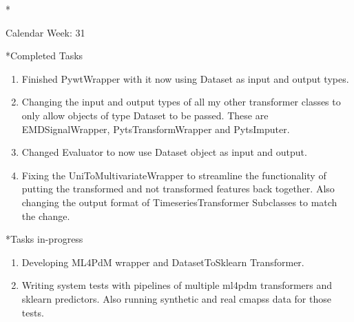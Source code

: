 \documentclass[11pt,a4paper]{article}
\begin{document}
\newpage
\begin{section}*{Calendar Week: 31 \hfill \date{06 August, 2021}}
	
	\begin{subsection}*{Completed Tasks}
		\begin{enumerate}
			\item Finished PywtWrapper with it now using Dataset as input and output types.
			\item Changing the input and output types of all my other transformer classes to only allow objects of type Dataset to be passed. These are EMDSignalWrapper, PytsTransformWrapper and PytsImputer.
			\item Changed Evaluator to now use Dataset object as input and output.
			\item Fixing the UniToMultivariateWrapper to streamline the functionality of putting the transformed and not transformed features back together. Also changing the output format of TimeseriesTransformer Subclasses to match the change.
		\end{enumerate}
	\end{subsection}
	
	\begin{subsection}*{Tasks in-progress}
		\begin{enumerate}
			\item Developing ML4PdM wrapper and DatasetToSklearn Transformer.
			\item Writing system tests with pipelines of multiple ml4pdm transformers and sklearn predictors. Also running synthetic and real cmapss data for those tests.
		\end{enumerate}
	\end{subsection}
	
\end{section}
\end{document}
